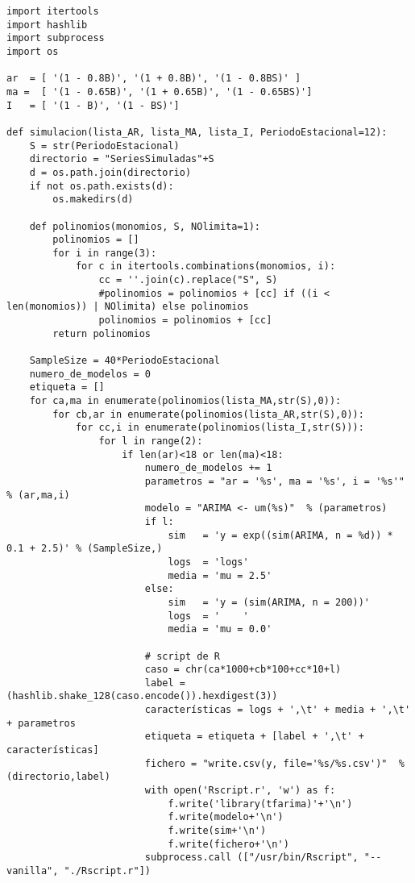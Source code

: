 \documentclass[11pt]{article}
\begin{document}
\begin{verbatim}
import itertools
import hashlib
import subprocess
import os

ar  = [ '(1 - 0.8B)', '(1 + 0.8B)', '(1 - 0.8BS)' ]
ma =  [ '(1 - 0.65B)', '(1 + 0.65B)', '(1 - 0.65BS)']
I   = [ '(1 - B)', '(1 - BS)']

def simulacion(lista_AR, lista_MA, lista_I, PeriodoEstacional=12):
    S = str(PeriodoEstacional)
    directorio = "SeriesSimuladas"+S
    d = os.path.join(directorio)
    if not os.path.exists(d):
        os.makedirs(d)

    def polinomios(monomios, S, NOlimita=1):
        polinomios = []
        for i in range(3):
            for c in itertools.combinations(monomios, i):
                cc = ''.join(c).replace("S", S)
                #polinomios = polinomios + [cc] if ((i < len(monomios)) | NOlimita) else polinomios
                polinomios = polinomios + [cc] 
        return polinomios

    SampleSize = 40*PeriodoEstacional
    numero_de_modelos = 0
    etiqueta = []
    for ca,ma in enumerate(polinomios(lista_MA,str(S),0)):
        for cb,ar in enumerate(polinomios(lista_AR,str(S),0)):
            for cc,i in enumerate(polinomios(lista_I,str(S))):
                for l in range(2):
                    if len(ar)<18 or len(ma)<18:
                        numero_de_modelos += 1 
                        parametros = "ar = '%s', ma = '%s', i = '%s'"  % (ar,ma,i)
                        modelo = "ARIMA <- um(%s)"  % (parametros)
                        if l: 
                            sim   = 'y = exp((sim(ARIMA, n = %d)) * 0.1 + 2.5)' % (SampleSize,)
                            logs  = 'logs'
                            media = 'mu = 2.5'
                        else:
                            sim   = 'y = (sim(ARIMA, n = 200))'
                            logs  = '    '
                            media = 'mu = 0.0'

                        # script de R
                        caso = chr(ca*1000+cb*100+cc*10+l)
                        label = (hashlib.shake_128(caso.encode()).hexdigest(3))
                        características = logs + ',\t' + media + ',\t' + parametros
                        etiqueta = etiqueta + [label + ',\t' + características]
                        fichero = "write.csv(y, file='%s/%s.csv')"  % (directorio,label)
                        with open('Rscript.r', 'w') as f:
                            f.write('library(tfarima)'+'\n')
                            f.write(modelo+'\n')
                            f.write(sim+'\n')
                            f.write(fichero+'\n')                            
                        subprocess.call (["/usr/bin/Rscript", "--vanilla", "./Rscript.r"])


\end{verbatim}
\end{document}
